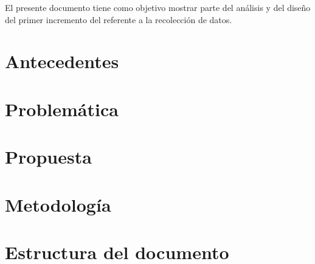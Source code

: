 El presente documento tiene como objetivo mostrar parte del análisis y del diseño del primer incremento del {\it \tituloTrabajo} referente a la recolección de datos. 

\section{Antecedentes}

\section{Problemática}

\section{Propuesta}

\section{Metodología}


\section{Estructura del documento}


